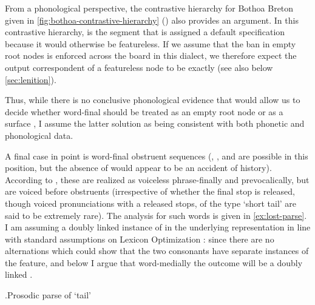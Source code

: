 From a phonological perspective, the contrastive hierarchy for Bothoa Breton given in \cref{fig:bothoa-contrastive-hierarchy} () also provides an argument. In this contrastive hierarchy, \ipa{[h]} is the segment that is assigned a default specification because it would otherwise be featureless. If we assume that the ban in empty root nodes is enforced across the board in this dialect, we therefore expect the output correspondent of a featureless node to be exactly \ipa{[h]} (see also below \cref{sec:lenition}).

Thus, while there is no conclusive phonological evidence that would allow us to decide whether  word-final \ipa{[h]} should be treated as an empty root node or as a surface \ipa{[h]}, I assume the latter solution as being consistent with both phonetic and phonological data.

A final case in point is word-final obstruent sequences (, , and  are possible in this position, but the absence of  would appear to be an accident of history). According to \citet{humphreys95:_phonol_bothoa_saint_nicol_pelem}, these are realized as voiceless phrase-finally and prevocalically, but are voiced before obstruents (irrespective of whether the final stop is released, though voiced pronunciations with a released stops, of the type  `short tail' are said to be extremely rare). The analysis for such words is given in \ref{ex:lost-parse}. I am assuming a doubly linked instance of  in the underlying representation in line with standard assumptions on Lexicon Optimization \citep{ot,inkelas94}: since there are no alternations which could show that the two consonants have separate instances of the feature, and below I argue that word-medially the outcome will be a doubly linked .

\ex.\label{ex:lost-parse}Prosodic parse of  `tail'\\

